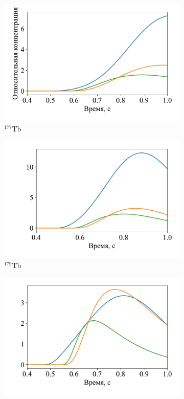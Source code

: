 \begin{figure}
  \vspace{0.3cm}
  \begin{subfigure}{0.32\textwidth}
    \centering
    \includegraphics[width=\textwidth]{pics/y_65_177.pdf}
    \caption{${}^{177}$Tb}
  \end{subfigure}
  \hfill
  \begin{subfigure}{0.32\textwidth}
    \centering
    \includegraphics[width=\textwidth]{pics/y_65_179.pdf}
    \caption{${}^{179}$Tb}
  \end{subfigure}
  \hfill
  \begin{subfigure}{0.32\textwidth}
    \centering
    \includegraphics[width=\textwidth]{pics/y_65_181.pdf}

\end{subfigure}
\end{figure}
